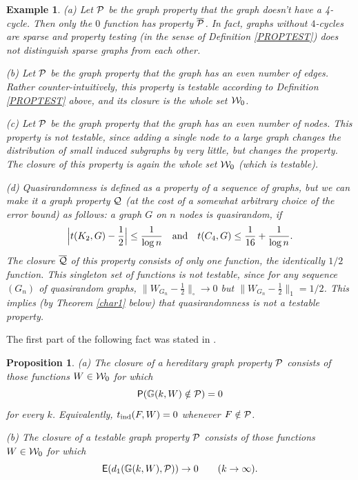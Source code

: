 \documentclass{article}
\newtheorem{prop}[theorem]{Proposition}
\newtheorem{example}[theorem]{Example}
\begin{document}
\begin{example}\label{TEST-GR-EX}
(a) Let $\mathcal{P}$ be the graph property that the graph doesn't have a
4-cycle. Then only the $0$ function has property $\overline{\mathcal{P}}$. In
fact, graphs without $4$-cycles are sparse and property testing (in
the sense of Definition \ref{PROPTEST}) does not distinguish sparse
graphs from each other.

\smallskip

(b)  Let $\mathcal{P}$ be the graph property that the graph has an even
number of edges. Rather counter-intuitively, this property is
testable according to Definition \ref{PROPTEST} above, and its
closure is the whole set $\mathcal{W}_0$.

\smallskip

(c) Let $\mathcal{P}$ be the graph property that the graph has an even number
of nodes. This property is not testable, since adding a single node
to a large graph changes the distribution of small induced subgraphs
by very little, but changes the property. The closure of this
property is again the whole set $\mathcal{W}_0$ (which is testable).

\smallskip

(d) Quasirandomness is defined as a property of a sequence of graphs,
but we can make it a graph property $\mathcal{Q}$ (at the cost of a somewhat
arbitrary choice of the error bound) as follows: a graph $G$ on $n$
nodes is {\it quasirandom}, if
\[
\Bigl| t(K_2,G) - \frac12\Bigr| \le \frac1{\log n} \quad \text{and}
\quad t(C_4,G) \le \frac1{16} + \frac{1}{\log n}.
\]
The closure $\overline{\mathcal{Q}}$ of this property consists of only one
function, the identically $1/2$ function. This singleton set of
functions is not testable, since for any sequence $(G_n)$ of
quasirandom graphs, $\|W_{G_n}-\frac12\|_\square\to 0$ but
$\|W_{G_n}-\frac12\|_1=1/2$. This implies (by Theorem \ref{char1}
below) that quasirandomness is not a testable property.
\end{example}

The first part of the following fact was stated in \cite{BCLSSV}.

\begin{prop}\label{lezaras}
{\rm (a)} The closure of a hereditary graph property $\mathcal{P}$
consists of those functions $W\in\mathcal{W}_0$ for which
\[
{\sf P}({\mathbb G}(k,W)\notin\mathcal{P})=0
\]
for every $k$. Equivalently, $t_{\rm ind}(F,W)=0$ whenever
$F\notin\mathcal{P}$.

\smallskip

{\rm (b)} The closure of a testable graph property $\mathcal{P}$ consists of
those functions $W\in\mathcal{W}_0$ for which
\[
{\sf E}(d_1({\mathbb G}(k,W),\mathcal{P}))\to 0\qquad (k\to\infty).
\]
\end{prop}
\end{document}
